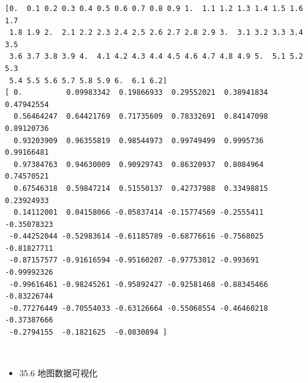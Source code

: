 \documentclass[11pt]{article}
\providecommand{\tightlist}{%
      \setlength{\itemsep}{0pt}\setlength{\parskip}{0pt}}
\begin{document}
    \begin{Verbatim}[commandchars=\\\{\}]
[0.  0.1 0.2 0.3 0.4 0.5 0.6 0.7 0.8 0.9 1.  1.1 1.2 1.3 1.4 1.5 1.6 1.7
 1.8 1.9 2.  2.1 2.2 2.3 2.4 2.5 2.6 2.7 2.8 2.9 3.  3.1 3.2 3.3 3.4 3.5
 3.6 3.7 3.8 3.9 4.  4.1 4.2 4.3 4.4 4.5 4.6 4.7 4.8 4.9 5.  5.1 5.2 5.3
 5.4 5.5 5.6 5.7 5.8 5.9 6.  6.1 6.2]
[ 0.          0.09983342  0.19866933  0.29552021  0.38941834  0.47942554
  0.56464247  0.64421769  0.71735609  0.78332691  0.84147098  0.89120736
  0.93203909  0.96355819  0.98544973  0.99749499  0.9995736   0.99166481
  0.97384763  0.94630009  0.90929743  0.86320937  0.8084964   0.74570521
  0.67546318  0.59847214  0.51550137  0.42737988  0.33498815  0.23924933
  0.14112001  0.04158066 -0.05837414 -0.15774569 -0.2555411  -0.35078323
 -0.44252044 -0.52983614 -0.61185789 -0.68776616 -0.7568025  -0.81827711
 -0.87157577 -0.91616594 -0.95160207 -0.97753012 -0.993691   -0.99992326
 -0.99616461 -0.98245261 -0.95892427 -0.92581468 -0.88345466 -0.83226744
 -0.77276449 -0.70554033 -0.63126664 -0.55068554 -0.46460218 -0.37387666
 -0.2794155  -0.1821625  -0.0830894 ]
    \end{Verbatim}

    \begin{center}
    \end{center}
    { \hspace*{\fill} \\}
    
    \begin{itemize}
\tightlist
\item
  35.6 地图数据可视化
\end{itemize}
\end{document}
